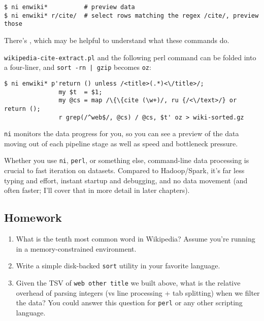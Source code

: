 \begin{verbatim}
$ ni enwiki*          # preview data
$ ni enwiki* r/cite/  # select rows matching the regex /cite/, preview those \end{verbatim}

There's
, which may be helpful to understand what
these commands do.

{\tt wikipedia-cite-extract.pl} and the following perl command can be folded
into a four-liner, and \verb/sort -rn | gzip/ becomes {\tt oz}:

\begin{verbatim}
$ ni enwiki* p'return () unless /<title>(.*)<\/title>/;
               my $t  = $1;
               my @cs = map /\{\{cite (\w+)/, ru {/<\/text>/} or return ();
               r grep(/^web$/, @cs) / @cs, $t' oz > wiki-sorted.gz\end{verbatim}

{\tt ni} monitors the data progress for you, so you can see a preview of the
data moving out of each pipeline stage as well as speed and bottleneck pressure.

Whether you use {\tt ni}, {\tt perl}, or something else, command-line data
processing is crucial to fast iteration on datasets. Compared to Hadoop/Spark,
it's far less typing and effort, instant startup and debugging, and no data
movement (and often faster; I'll cover that in more detail in later chapters).

\subsection{Homework}
\begin{enumerate}
  \item What is the tenth most common word in Wikipedia? Assume you're running
        in a memory-constrained environment.
  \item Write a simple disk-backed {\tt sort} utility in your favorite language.
  \item Given the TSV of {\tt web other title} we built above, what is the
        relative overhead of parsing integers (vs line processing + tab
        splitting) when we filter the data? You could answer this question for
        {\tt perl} or any other scripting language.
\end{enumerate}
